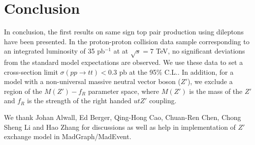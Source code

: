 \section{Conclusion}
\label{sec:conclusion}
In conclusion, the first results on same sign top pair production using 
dileptons have been presented. 
In the proton-proton collision data sample corresponding to an 
integrated luminosity of 35 pb$^{-1}$ at at $\sqrt{s} = 7 $ TeV, 
no significant deviations from the standard model expectations are observed. 
We use these data to set a cross-section limit $\sigma(pp \to tt) < 0.3$ pb at the 95\% C.L..
In addition, for a model with a non-universal massive neutral vector boson ($Z'$), we exclude 
a region of the $M(Z')-f_R$ parameter space, where $M(Z')$ is the mass of the $Z'$ 
and $f_R$ is the strength of the right handed $utZ'$ coupling.



\ack

We thank Johan Alwall, Ed Berger, Qing-Hong Cao, Chuan-Ren Chen, Chong Sheng Li and Hao Zhang for 
discussions as well as help in implementation of $Z'$ exchange model in MadGraph/MadEvent. 



